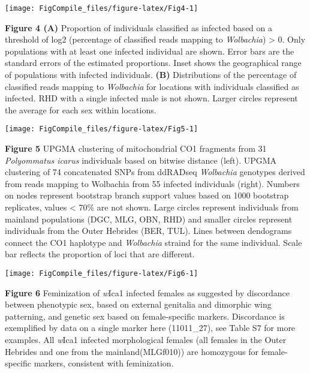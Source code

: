 \documentclass[12pt,]{article}
\begin{document}
\begin{center}\texttt{[image: FigCompile\_files/figure-latex/Fig4-1]} \end{center}

\textbf{Figure 4 (A)} Proportion of individuals classified as infected
based on a threshold of log2 (percentage of classified reads mapping to
\emph{Wolbachia}) \textgreater{} 0. Only populations with at least one
infected individual are shown. Error bars are the standard errors of the
estimated proportions. Inset shows the geographical range of populations
with infected individuals. \textbf{(B)} Distributions of the percentage
of classified reads mapping to \emph{Wolbachia} for locations with
individuals classified as infected. RHD with a single infected male is
not shown. Larger circles represent the average for each sex within
locations.

\pagebreak

\begin{center}\texttt{[image: FigCompile\_files/figure-latex/Fig5-1]} \end{center}

\textbf{Figure 5} UPGMA clustering of mitochondrial CO1 fragments from
31 \emph{Polyommatus icarus} individuals based on bitwise distance
(left). UPGMA clustering of 74 concatenated SNPs from ddRADseq
\emph{Wolbachia} genotypes derived from reads mapping to Wolbachia from
55 infected individuals (right). Numbers on nodes represent bootstrap
branch support values based on 1000 bootstrap replicates, values
\textless{} 70\% are not shown. Large circles represent individuals from
mainland populations (DGC, MLG, OBN, RHD) and smaller circles represent
individuals from the Outer Hebrides (BER, TUL). Lines between dendograms
connect the CO1 haplotype and \emph{Wolbachia} straind for the same
individual. Scale bar reflects the proportion of loci that are
different.

\pagebreak

\begin{center}\texttt{[image: FigCompile\_files/figure-latex/Fig6-1]} \end{center}

\textbf{Figure 6} Feminization of \emph{w}Ica1 infected females as
suggested by discordance between phenotypic sex, based on external
genitalia and dimorphic wing patterning, and genetic sex based on
female-specific markers. Discordance is exemplified by data on a single
marker here (11011\_27), see Table S7 for more examples. All
\emph{w}Ica1 infected morphological females (all females in the Outer
Hebrides and one from the mainland(MLGf010)) are homozygous for
female-specific markers, consistent with feminization.
\end{document}
